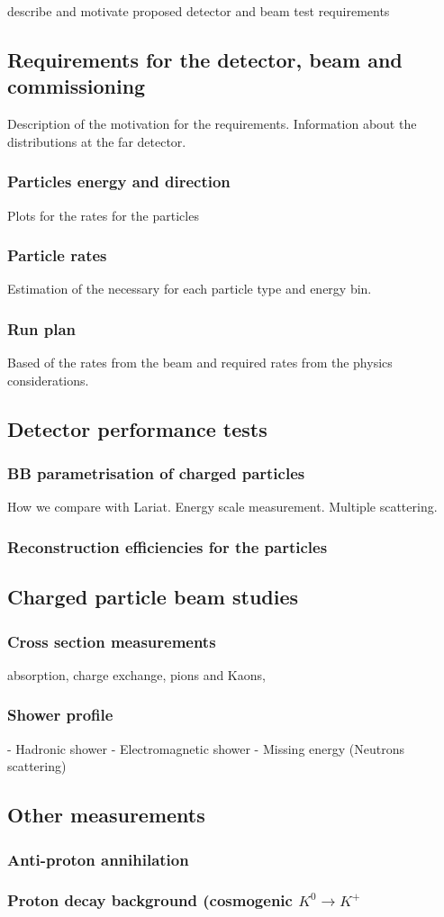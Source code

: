 describe and motivate proposed detector and beam test requirements 


\subsection{Requirements for the detector, beam and commissioning}
Description of the motivation for the requirements. Information about the distributions at the far detector. 

\subsubsection{Particles energy and direction}
Plots for the  rates for the particles
\subsubsection{Particle rates}
Estimation of the necessary for each particle type and energy bin. 
\subsubsection {Run plan}
Based of the rates from the beam and required rates from the physics considerations.


\subsection{Detector performance tests}
\subsubsection{BB parametrisation of charged particles}
How we compare with Lariat. Energy scale measurement. 
Multiple scattering.  

\subsubsection{Reconstruction efficiencies for the particles}


\subsection{Charged particle beam studies}
\subsubsection{Cross section measurements}
absorption, charge exchange, pions and Kaons, 

\subsubsection{Shower profile}
- Hadronic shower
- Electromagnetic shower
- Missing energy (Neutrons scattering)
 

\subsection{Other measurements} 
\subsubsection{Anti-proton annihilation }
\subsubsection{Proton decay background (cosmogenic $K^{0} \to K^+$}
